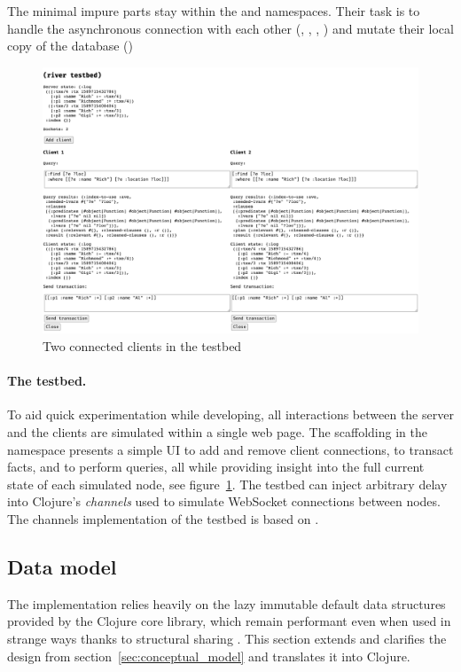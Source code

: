 The minimal impure parts stay within the  and  namespaces. Their task is to handle the asynchronous connection with each other (, , , ) and mutate their local copy of the database ()


\cleardoublepage
\begin{figure}[!ht]
  \includegraphics[width=\linewidth]{images/testbed.png}
  \caption{Two connected clients in the testbed}
  \label{fig:testbed}
\end{figure}

\paragraph{The testbed.} To aid quick experimentation while developing, all interactions between the server and the clients are simulated within a single web page. The scaffolding in the  namespace presents a simple UI to add and remove client connections, to transact facts, and to perform queries, all while providing insight into the full current state of each simulated node, see figure~\ref{fig:testbed}. The testbed can inject arbitrary delay into Clojure's  \emph{channels} used to simulate WebSocket connections between nodes. The channels implementation of the testbed is based on \cite{ittyon}.


\cleardoublepage

\subsection{Data model}\label{sec:impl_datamodel}
The implementation relies heavily on the lazy immutable default data structures \cite{hickey2009persistent} provided by the Clojure core library, which remain performant even when used in strange ways thanks to structural sharing \cite{okasaki1999purely}. This section extends and clarifies the design from section~\ref{sec:conceptual_model} and translates it into Clojure.

